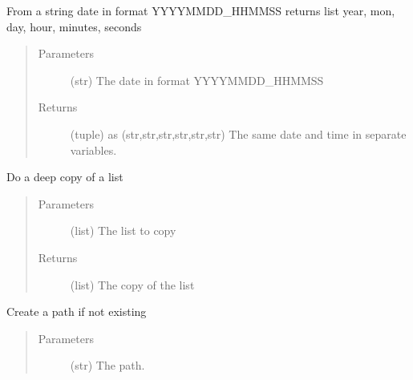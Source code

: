 \documentclass[a4paper,10pt,english]{sphinxmanual}
\begin{document}
\begin{fulllineitems}
\label{\detokenize{apidoc_src/src:src.utilsSat.date_to_datetime}}
From a string date in format YYYYMMDD\_HHMMSS
returns list year, mon, day, hour, minutes, seconds
\begin{quote}\begin{description}
\item[{Parameters}] \leavevmode
{} \textendash{} (str) The date in format YYYYMMDD\_HHMMSS

\item[{Returns}] \leavevmode
(tuple) as (str,str,str,str,str,str)
The same date and time in separate variables.

\end{description}\end{quote}

\end{fulllineitems}


\begin{fulllineitems}
\label{\detokenize{apidoc_src/src:src.utilsSat.deepcopy_list}}
Do a deep copy of a list
\begin{quote}\begin{description}
\item[{Parameters}] \leavevmode
{} \textendash{} (list) The list to copy

\item[{Returns}] \leavevmode
(list) The copy of the list

\end{description}\end{quote}

\end{fulllineitems}


\begin{fulllineitems}
\label{\detokenize{apidoc_src/src:src.utilsSat.ensure_path_exists}}
Create a path if not existing
\begin{quote}\begin{description}
\item[{Parameters}] \leavevmode
{} \textendash{} (str) The path.

\end{description}\end{quote}

\end{fulllineitems}
\end{document}
